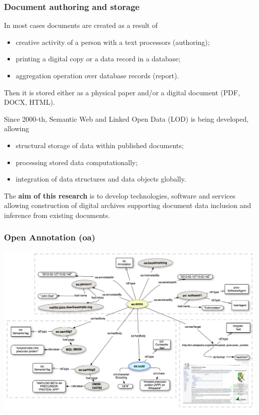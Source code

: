 \documentclass[10pt]{beamer}
\begin{document}
\begin{frame}
  \frametitle{Document authoring and storage}
  In most cases documents are created as a result of
  \begin{itemize}
  \item creative activity of a person with a text processors (authoring);
  \item printing a digital copy or a data record in a database;
  \item aggregation operation over database records (report).
  \end{itemize}
  Then it is stored either as a physical paper and/or a digital document (PDF, DOCX, HTML).

  Since 2000-th, Semantic Web and Linked Open Data (LOD) is being developed, allowing
  \begin{itemize}
  \item structural storage of data within published documents;
  \item processing stored data computationally;
  \item integration of data structures and data objects globally.
  \end{itemize}

  The \textbf{aim of this research} is to develop technologies, software and services allowing construction of digital archives supporting document data inclusion and inference from existing documents.
\end{frame}

\begin{frame}
  \frametitle{Open Annotation (oa)}
\begin{adjustwidth}{-3em}{-3em}
  \centering
  \includegraphics[width=1\linewidth]{Open-Annotation_CB_Bookmarking_and_Semantically_Tagging_A_webpage_spec20130128.png}
\end{adjustwidth}

\end{frame}
\end{document}
